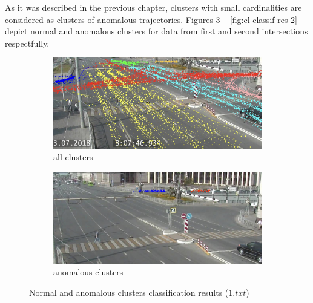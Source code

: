 As it was described in the previous chapter, clusters with small cardinalities are considered as clusters of anomalous trajectories. Figures \ref{fig:cl-classif-res-1} -- \ref{fig:cl-classif-res-2} depict normal and anomalous clusters for data from first and second intersections respectfully.
\begin{figure}[!htb]
	\centering
	\begin{subfigure}[!htb]{0.495\textwidth}
		\centering{}
		\includegraphics[width=\textwidth]{images/cl-classif-norm-1.jpeg}
		\caption{all clusters}
		\label{fig:cl-classif-norm-1}
	\end{subfigure}
	\hfill
	\begin{subfigure}[!htb]{0.495\textwidth}
		\centering{}
		\includegraphics[width=\textwidth]{images/cl-classif-anom-1.jpeg}
		\caption{anomalous clusters}
		\label{fig:cl-classif-anom-1}
	\end{subfigure}
	\caption{Normal and anomalous clusters classification results ($1.txt$)}
	\label{fig:cl-classif-res-1}
\end{figure}

